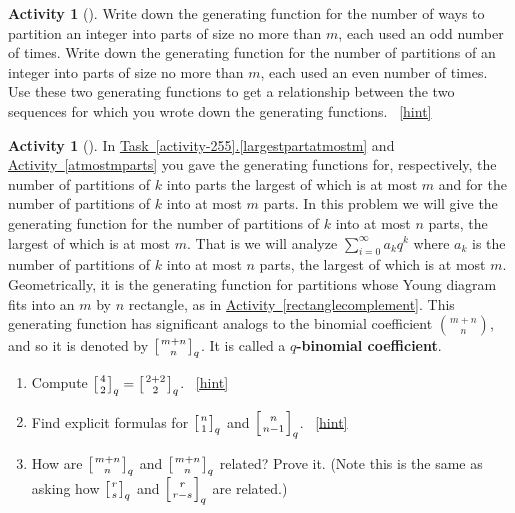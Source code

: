 \documentclass[10pt,]{book}
\newcommand{\terminology}[1]{\textbf{#1}}
\theoremstyle{plain}
\theoremstyle{definition}
\theoremstyle{definition}
\theoremstyle{definition}
\newtheorem{activity}[project]{Activity}
\numberwithin{equation}{chapter}
\newcommand{\qchoose}[2]{\left[{#1\atop#2}\right]_q}
\begin{document}
\begin{activity}[]\label{activity-264}
\hypertarget{p-1205}{}%
Write down the generating function for the number of ways to partition an integer into parts of size no more than \(m\), each used an odd number of times. Write down the generating function for the number of partitions of an integer into parts of size no more than \(m\), each used an even number of times. Use these two generating functions to get a relationship between the two sequences for which you wrote down the generating functions.%
~\hfill{\tiny\hyperlink{a-264}{[hint]}\hypertarget{q-264}{}}\end{activity}
\begin{activity}[]\label{qtorialformula}
\hypertarget{p-1208}{}%
In \hyperref[largestpartatmostm]{Task~\ref{activity-255}.\ref{largestpartatmostm}} and \hyperref[atmostmparts]{Activity~\ref{atmostmparts}} you gave the generating functions for, respectively, the number of partitions of \(k\) into parts the largest of which is at most \(m\) and for the number of partitions of \(k\) into at most \(m\) parts. In this problem we will give the generating function for the number of partitions of \(k\) into at most \(n\) parts, the largest of which is at most \(m\). That is we will analyze \(\sum_{i=0}^\infty a_kq^k\) where \(a_k\) is the number of partitions of \(k\) into at most \(n\) parts, the largest of which is at most \(m\). Geometrically, it is the generating function for partitions whose Young diagram fits into an \(m\) by \(n\) rectangle, as in \hyperref[rectanglecomplement]{Activity~\ref{rectanglecomplement}}. This generating function has significant analogs to the binomial coefficient \(\binom{m+n}{n}\), and so it is denoted by \(\qchoose{m+n}{n}\). It is called a \terminology{\(q\)-binomial coefficient}.%
\begin{enumerate}[font=\bfseries,label=(\alph*),ref=\alph*]
\item\label{task-210} \hypertarget{p-1209}{}%
Compute \(\qchoose{4}{2}=\qchoose{2+2}{2}\).%
~\hfill{\tiny\hyperlink{a-265.a}{[hint]}\hypertarget{q-265.a}{}}\item\label{task-211} \hypertarget{p-1212}{}%
Find explicit formulas for \(\qchoose{n}{1}\) and \(\qchoose{n}{n-1}\).%
~\hfill{\tiny\hyperlink{a-265.b}{[hint]}\hypertarget{q-265.b}{}}\item\label{task-212} \hypertarget{p-1215}{}%
How are \(\qchoose{m+n}{n}\) and \(\qchoose{m+n}{n}\) related? Prove it. (Note this is the same as asking how \(\qchoose{r}{s}\) and \(\qchoose{r}{r-s}\) are related.)%

\end{enumerate}
\end{activity}
\end{document}
